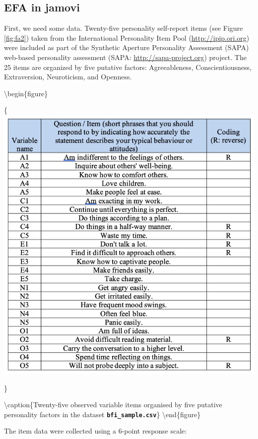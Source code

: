 \documentclass[
]{book}
\begin{document}
\hypertarget{efa-in-jamovi}{%
\subsection{EFA in jamovi}\label{efa-in-jamovi}}

First, we need some data. Twenty-five personality self-report items (see Figure \ref{fig:fa2}) taken from the International Personality Item Pool (\url{http://ipip.ori.org}) were included as part of the Synthetic Aperture Personality Assessment (SAPA) web-based personality assessment (SAPA: \url{http://sapa-project.org}) project. The 25 items are organized by five putative factors: Agreeableness, Conscientiousness, Extraversion, Neuroticism, and Openness.

\textbackslash begin\{figure\}

\{\centering \includegraphics[width=1\linewidth]{img/factoranalysis/fa2}

\}

\textbackslash caption\{Twenty-five observed variable items organised by five putative personality factors in the dataset \textbf{\texttt{bfi\_sample.csv}}\}\label{fig:fa2}
\textbackslash end\{figure\}

The item data were collected using a 6-point response scale:
\end{document}
